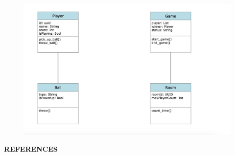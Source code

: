 \documentclass[12pt]{report}
\begin{document}
\begin{figure}[h]
\centering
\includegraphics[scale=0.9]{images14.png}

\end{figure}
\vspace{15 cm}


\centering
\Large\textbf{REFERENCES}
\justifying
\setlength{\parindent}{4em}
\setlength{\parskip}{0.5em}
\renewcommand{\baselinestretch}{1.5}
\normalsize
\end{document}
